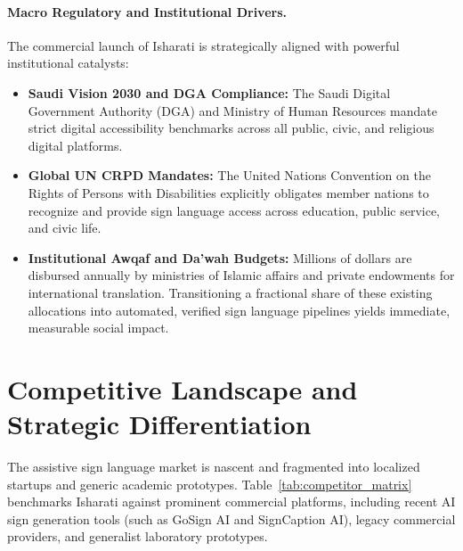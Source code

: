 \paragraph{Macro Regulatory and Institutional Drivers.}
The commercial launch of Isharati is strategically aligned with powerful institutional catalysts:
\begin{itemize}[leftmargin=*,itemsep=2pt]
  \item \textbf{Saudi Vision 2030 and DGA Compliance:} The Saudi Digital Government Authority (DGA) and Ministry of Human Resources mandate strict digital accessibility benchmarks across all public, civic, and religious digital platforms.
  \item \textbf{Global UN CRPD Mandates:} The United Nations Convention on the Rights of Persons with Disabilities explicitly obligates member nations to recognize and provide sign language access across education, public service, and civic life.
  \item \textbf{Institutional Awqaf and Da'wah Budgets:} Millions of dollars are disbursed annually by ministries of Islamic affairs and private endowments for international translation. Transitioning a fractional share of these existing allocations into automated, verified sign language pipelines yields immediate, measurable social impact.
\end{itemize}

\section{Competitive Landscape and Strategic Differentiation}
\label{sec:biz_competition}
The assistive sign language market is nascent and fragmented into localized startups and generic academic prototypes. Table~\ref{tab:competitor_matrix} benchmarks Isharati against prominent commercial platforms, including recent AI sign generation tools (such as GoSign AI and SignCaption AI), legacy commercial providers, and generalist laboratory prototypes.

